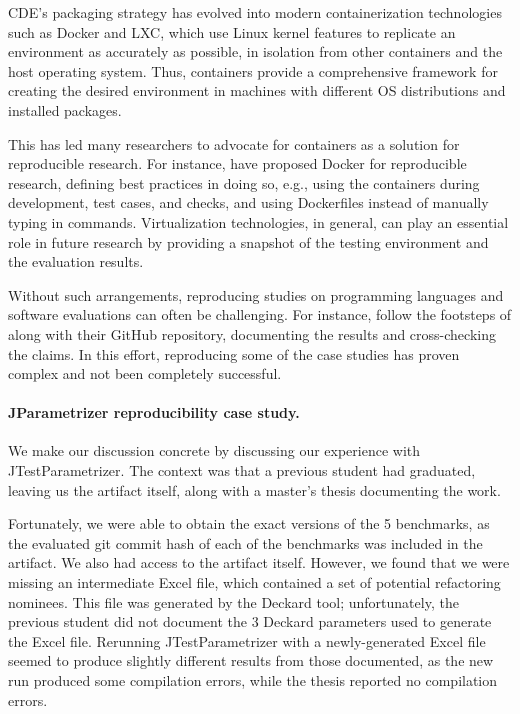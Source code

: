 CDE's packaging strategy has evolved into modern containerization technologies such as Docker and LXC, which use Linux kernel features to replicate an environment as accurately as possible, in isolation from other containers and the host operating system. Thus, containers provide a comprehensive framework for creating the desired environment in machines with different OS distributions and installed packages. 

This has led many researchers to advocate for containers as a solution for reproducible research. For instance,  have proposed Docker for reproducible research, defining best practices in doing so, e.g., using the containers during development, test cases, and checks, and using Dockerfiles instead of manually typing in commands. Virtualization technologies, in general, can play an essential role in future research by providing a snapshot of the testing environment and the evaluation results.

Without such arrangements, reproducing studies on programming languages and software evaluations can often be challenging. For instance,  follow the footsteps of  along with their GitHub repository, documenting the results and cross-checking the claims. In this effort, reproducing some of the case studies has proven complex and not been completely successful.

\paragraph{JParametrizer reproducibility case study.}
We make our discussion concrete by discussing our experience with JTestParametrizer. The context was that a previous student had graduated, leaving us the artifact itself, along with a master's thesis documenting the work. 

Fortunately, we were able to obtain the exact versions of the 5 benchmarks, as the evaluated git commit hash of each of the benchmarks was included in the artifact. We also had access to the artifact itself. However, we found that we were missing an intermediate Excel file, which contained a set of potential refactoring nominees. This file was generated by the Deckard tool; unfortunately, the previous student did not document the 3 Deckard parameters used to generate the Excel file. Rerunning JTestParametrizer with a newly-generated Excel file seemed to produce slightly different results from those documented, as the new run produced some compilation errors, while the thesis reported no compilation errors.

